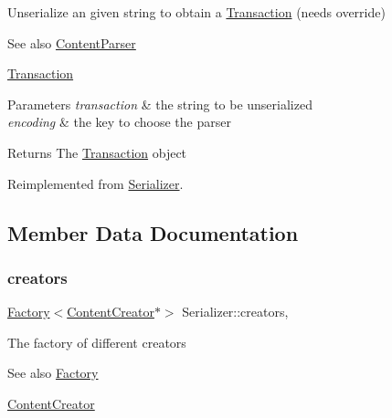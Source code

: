Unserialize an given string to obtain a \mbox{\hyperlink{classTransaction}{Transaction}} (needs override) \begin{DoxySeeAlso}{See also}
\mbox{\hyperlink{classContentParser}{Content\+Parser}} 

\mbox{\hyperlink{classTransaction}{Transaction}}
\end{DoxySeeAlso}

\begin{DoxyParams}{Parameters}
{\em transaction} & the string to be unserialized \\
\hline
{\em encoding} & the key to choose the parser \\
\hline
\end{DoxyParams}
\begin{DoxyReturn}{Returns}
The \mbox{\hyperlink{classTransaction}{Transaction}} object 
\end{DoxyReturn}


Reimplemented from \mbox{\hyperlink{classSerializer_ab5fa979a8486be6f49ad10f4810509d7}{Serializer}}.



\subsection{Member Data Documentation}
\mbox{\label{classSerializer_a7d26e865966b304350653b1246ec3340}} 
\subsubsection{\texorpdfstring{creators}{creators}}
{\footnotesize\ttfamily \mbox{\hyperlink{classFactory}{Factory}}$<$\mbox{\hyperlink{classContentCreator}{Content\+Creator}}$\ast$$>$ Serializer\+::creators\hspace{0.3cm}{\ttfamily [protected]}, {\ttfamily [inherited]}}

The factory of different creators \begin{DoxySeeAlso}{See also}
\mbox{\hyperlink{classFactory}{Factory}} 

\mbox{\hyperlink{classContentCreator}{Content\+Creator}} 
\end{DoxySeeAlso}
\mbox{\label{classSerializer_a96f96c01e6a471513669621751591fd9}} 
